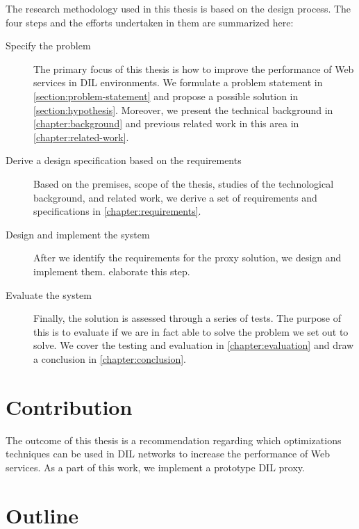 The research methodology used in this thesis is based on the design process. The
four steps and the efforts undertaken in them are summarized here:

\begin{description}

    \item[Specify the problem] The primary focus of this thesis is how to
    improve the performance of Web services in DIL environments. We formulate a
    problem statement in \cref{section:problem-statement} and propose a possible
    solution in \cref{section:hypothesis}. Moreover, we present the technical
    background in \cref{chapter:background} and previous related work in this
    area in  \cref{chapter:related-work}.

    \item[Derive a design specification based on the requirements] Based on the
    premises, scope of the thesis, studies of the technological background, and
    related work, we derive a set of requirements and specifications in
    \cref{chapter:requirements}.

    \item[Design and implement the system] After we identify the requirements
    for the proxy solution, we design and implement them.
     elaborate this step.

    \item[Evaluate the system] Finally, the solution is assessed through a
    series of tests. The purpose of this is to evaluate if we are in fact able
    to solve the problem we set out to solve. We cover the testing and
    evaluation in \cref{chapter:evaluation} and draw a conclusion in
    \cref{chapter:conclusion}.

\end{description}


\section{Contribution}

The outcome of this thesis is a recommendation regarding which optimizations
techniques can be used in DIL networks to increase the performance of Web
services. As a part of this work, we implement a prototype DIL proxy.

\section{Outline}

